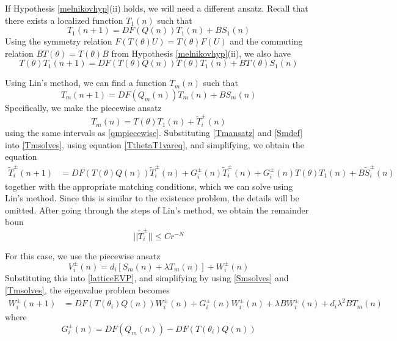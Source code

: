 \documentclass[12pt]{article}
\begin{document}
If Hypothesis \ref{melnikovhyp}(ii) holds, we will need a different ansatz. Recall that there exists a localized function $T_1(n)$ such that 
\begin{equation}\label{T1vareq}
T_1(n+1) = DF(Q(n)) T_1(n) + B S_1(n)
\end{equation}
Using the symmetry relation $F(T(\theta)U) = T(\theta)F(U)$ and the commuting relation $B T(\theta) = T(\theta)B$ from Hypothesis \ref{melnikovhyp}(ii), we also have
\begin{equation}\label{TthetaT1vareq}
T(\theta)T_1(n+1) = DF(T(\theta)Q(n)) T(\theta)T_1(n) + B T(\theta) S_1(n)
\end{equation}

Using Lin's method, we can find a function $T_m(n)$ such that
\begin{equation}\label{Tmsolves}
T_m(n+1) = DF(Q_m(n)) T_m(n) + B S_m(n)
\end{equation}
Specifically, we make the piecewise ansatz 
\begin{equation}\label{Tmansatz}
T_m(n) = T(\theta)T_1(n) + \tilde{T}_i^\pm(n)
\end{equation}
using the same intervals as \eqref{qmpiecewise}. Substituting \eqref{Tmansatz} and \eqref{Smdef} into \eqref{Tmsolves}, using equation \eqref{TthetaT1vareq}, and simplifying, we obtain the equation
\begin{align*}
\tilde{T}_i^\pm(n+1) 
&= DF(T(\theta)Q(n)) \tilde{T}_i^\pm(n)
+ G_i^\pm(n) \tilde{T}_i^\pm(n) + G_i^\pm(n) T(\theta)T_1(n) + B \tilde{S}_i^\pm(n)
\end{align*}
together with the appropriate matching conditions, which we can solve using Lin's method. Since this is similar to the existence problem, the details will be omitted. After going through the steps of Lin's method, we obtain the remainder boun
\begin{equation}\label{Tipmbound}
|| \tilde{T}_i^\pm || \leq C r^{-N}
\end{equation}

For this case, we use the piecewise ansatz
\begin{equation}\label{Viansatz2}
V_i^\pm(n) = 
d_i [ S_m(n) + \lambda T_m(n) ] + W_i^\pm(n)
\end{equation}
Substituting this into \eqref{latticeEVP}, and simplifying by using \eqref{Smsolves} and \eqref{Tmsolves}, the eigenvalue problem becomes
\begin{align}\label{Weq1}
W_i^\pm(n+1)
&= DF(T(\theta_i) Q(n) ) W_i^\pm(n) + G_i^\pm(n)W_i^\pm(n) + \lambda B W_i^\pm(n) + d_i \lambda^2 B T_m(n)
\end{align}
where
\begin{equation}
G_i^\pm(n) = DF(Q_m(n)) - DF(T(\theta_i) Q(n) )
\end{equation}
\end{document}
